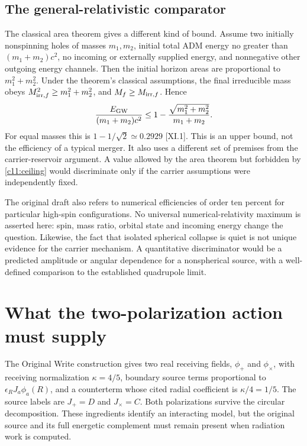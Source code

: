 \subsection{The general-relativistic comparator}
The classical area theorem gives a different kind of bound. Assume two initially nonspinning holes of masses $m_1,m_2$, initial total ADM energy no greater than $(m_1+m_2)c^2$, no incoming or externally supplied energy, and nonnegative other outgoing energy channels. Then the initial horizon areas are proportional to $m_1^2+m_2^2$. Under the theorem's classical assumptions, the final irreducible mass obeys $M_{{\rm irr},f}^2\geq m_1^2+m_2^2$, and $M_f\geq M_{{\rm irr},f}$. Hence
\begin{equation}
 \frac{E_{\rm GW}}{(m_1+m_2)c^2}
 \leq 1-\frac{\sqrt{m_1^2+m_2^2}}{m_1+m_2}.
 \label{c11:areabound}
\end{equation}
For equal masses this is $1-1/\sqrt2\simeq0.2929$ [XI.1]. This is an upper bound, not the efficiency of a typical merger. It also uses a different set of premises from the carrier-reservoir argument. A value allowed by the area theorem but forbidden by \eqref{c11:ceiling} would discriminate only if the carrier assumptions were independently fixed.

The original draft also refers to numerical efficiencies of order ten percent for particular high-spin configurations. No universal numerical-relativity maximum is asserted here: spin, mass ratio, orbital state and incoming energy change the question. Likewise, the fact that isolated spherical collapse is quiet is not unique evidence for the carrier mechanism. A quantitative discriminator would be a predicted amplitude or angular dependence for a nonspherical source, with a well-defined comparison to the established quadrupole limit.

\section{What the two-polarization action must supply}
The Original Write construction gives two real receiving fields, $\phi_+$ and $\phi_\times$, with receiving normalization $\kappa=4/5$, boundary source terms proportional to $\epsilon_R J_a\phi_a(R)$, and a counterterm whose cited radial coefficient is $\kappa/4=1/5$. The source labels are $J_+=D$ and $J_\times=C$. Both polarizations survive the circular decomposition. These ingredients identify an interacting model, but the original source and its full energetic complement must remain present when radiation work is computed.


